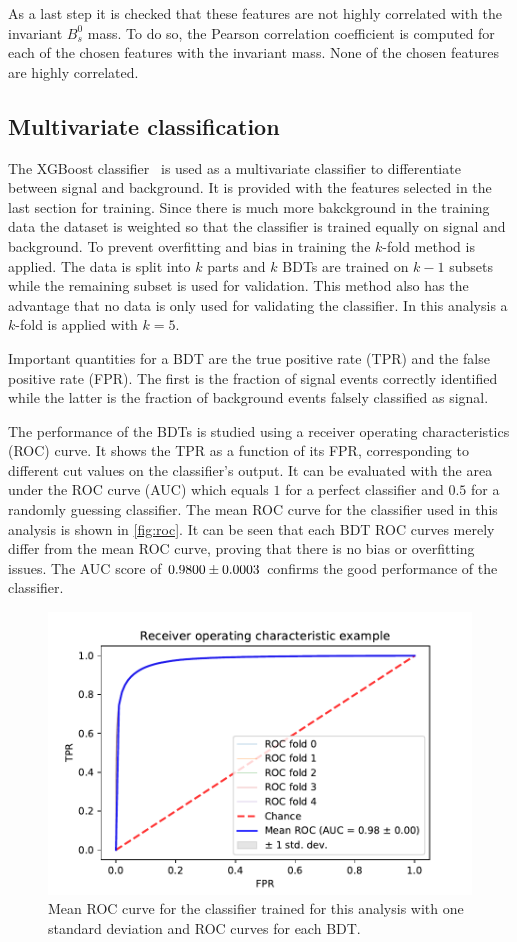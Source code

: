 As a last step it is checked that these features are not highly correlated with the invariant $B^0_s$ mass. To do so, the Pearson correlation coefficient is computed for each of the chosen features with the invariant mass. None of the chosen features are highly correlated.

\subsection{Multivariate classification}
The XGBoost classifier~\cite{Chen:2016:XST:2939672.2939785} is used as a multivariate classifier to differentiate between signal and background. It is provided with the features selected in the last section for training. Since there is much more bakckground in the training data the dataset is weighted so that the classifier is trained equally on signal and background. To prevent overfitting and bias in training the $k$-fold method is applied. The data is split into $k$ parts and $k$ BDTs are trained on $k - 1$ subsets while the remaining subset is used for validation. This method also has the advantage that no data is only used for validating the classifier. In this analysis a $k$-fold is applied with $k = 5$.

Important quantities for a BDT are the true positive rate (TPR) and the false positive rate (FPR). The first is the fraction of signal events correctly identified while the latter is the fraction of background events falsely classified as signal.

The performance of the BDTs is studied using a receiver operating characteristics (ROC) curve. It shows the TPR as a function of its FPR, corresponding to different cut values on the classifier's output. It can be evaluated with the area under the ROC curve (AUC) which equals $1$ for a perfect classifier and $0.5$ for a randomly guessing classifier. The mean ROC curve for the classifier used in this analysis is shown in \autoref{fig:roc}. It can be seen that each BDT ROC curves merely differ from the mean ROC curve, proving that there is no bias or overfitting issues. The AUC score of $\num{0.98 \pm 0.0003}$ confirms the good performance of the classifier.

\begin{figure}[tb]
  \centering
  \includegraphics[width=.8\textwidth]{plots/roc.pdf}
  \caption{Mean ROC curve for the classifier trained for this analysis with one standard deviation and ROC curves for each BDT.}
  \label{fig:roc}
\end{figure}

